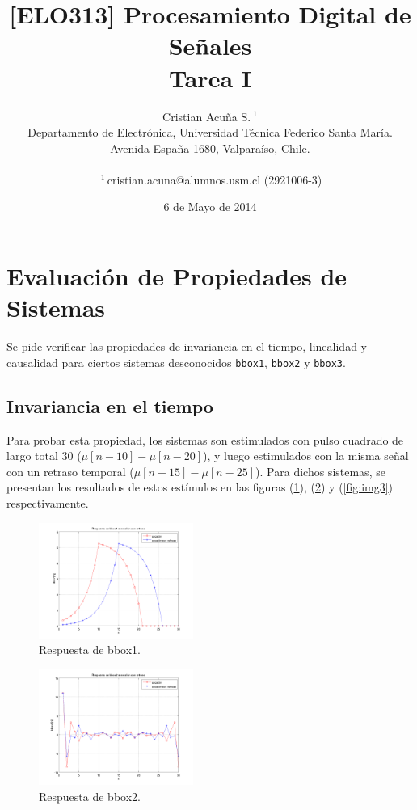 \documentclass[10pt,conference,a4paper]{IEEEtran}
\title{[ELO313] Procesamiento Digital de Se\~nales\\ 
Tarea I}
\author{Cristian Acuña S.{\small $~^1$}
\vspace{1.6mm}\\
Departamento de Electrónica, Universidad Técnica Federico Santa María.\\
	Avenida España 1680, Valparaíso, Chile.\\
	\fontsize{9}{9}\selectfont\ttfamily\upshape

	$~^{1}$\,cristian.acuna@alumnos.usm.cl (2921006-3)
}
\date{6 de Mayo de 2014}
\begin{document}
\maketitle

\section{Evaluaci\'on de Propiedades de Sistemas}

Se pide verificar las propiedades de invariancia en el tiempo, linealidad y 
causalidad para ciertos sistemas desconocidos \verb|bbox1|, \verb|bbox2| y 
\verb|bbox3|.

\subsection{Invariancia en el tiempo}

Para probar esta propiedad, los sistemas son estimulados con pulso cuadrado de 
largo total 30 ($\mu[n-10]-\mu[n-20]$), y luego estimulados con la misma 
se\~nal con un retraso temporal ($\mu[n-15]-\mu[n-25]$). Para dichos sistemas, 
se presentan los resultados de estos est\'imulos en las figuras 
(\ref{fig:img1}), (\ref{fig:img2}) y (\ref{fig:img3}) respectivamente.

\begin{figure}[H]
  \centering
  \includegraphics[width=0.45\textwidth]{../img/img1.png}
  \caption{Respuesta de bbox1.}
  \label{fig:img1}
\end{figure}

\begin{figure}[H]
  \centering
  \includegraphics[width=0.45\textwidth]{../img/img2.png}
  \caption{Respuesta de bbox2.}
  \label{fig:img2}
\end{figure}
\end{document}

